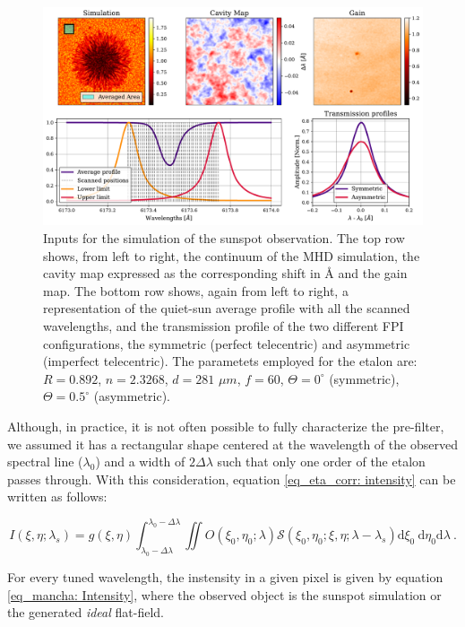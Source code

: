 \begin{figure}
    \includegraphics[width=\textwidth]{figures/Mancha/Inputs_mancha.pdf}
    \caption{
      Inputs for the simulation of the sunspot observation. The top row shows, from left to right, the continuum of the MHD simulation, the cavity map expressed as the corresponding shift in \r{A} and the gain map. The bottom row shows, again from left to right, a representation of the quiet-sun average profile with all the scanned wavelengths, and the transmission profile of the two different FPI configurations, the symmetric (perfect telecentric) and asymmetric (imperfect telecentric). The parametets employed for the etalon are: $R=0.892$, $n = 2.3268$, $d = 281$ $\mu m$, $f = 60$, $\Theta = 0^{\circ}$ (symmetric), $\Theta = 0.5^{\circ}$ (asymmetric).
      \label{fig_mancha: Inputs}}
\end{figure}

Although, in practice, it is not often possible to fully characterize the pre-filter, we assumed it has a rectangular shape centered at the wavelength of the observed spectral line ($\lambda _ {0}$) and a width of $2\Delta \lambda$ such that only one order of the etalon passes through. With this consideration, equation \eqref{eq_eta_corr: intensity} can be written as follows:

\begin{equation}
  I\left(\xi, \eta ; \lambda_{s}\right)=g(\xi, \eta)\int_{\lambda _ 0 - \Delta \lambda}^{\lambda _ 0 - \Delta \lambda} \iint  O\left(\xi_0, \eta_0 ; \lambda\right)  \mathcal{S}\left(\xi_0, \eta_0; \xi , \eta; \lambda-\lambda_{s}\right)  \mathrm{d} \xi_{0} \mathrm{~d} \eta_{0}\mathrm{d} \lambda \ .
  \label{eq_mancha: Intensity}
\end{equation}

For every tuned wavelength, the instensity in a given pixel is given by equation \eqref{eq_mancha: Intensity}, where the observed object is the sunspot simulation or the generated \textit{ideal} flat-field. 

